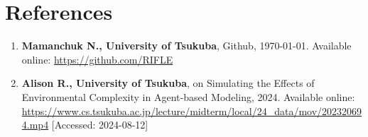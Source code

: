 \documentclass[12pt,a4paper]{article}
\begin{document}


\section*{References}
\begin{enumerate}
    \item \textbf{Mamanchuk N., University of Tsukuba}, Github, \today. Available online: \url{https://github.com/RIFLE}
    \item \textbf{Alison R., University of Tsukuba}, on Simulating the Effects of Environmental Complexity in Agent-based Modeling, 2024. Available online: \url{https://www.cs.tsukuba.ac.jp/lecture/midterm/local/24_data/mov/202320694.mp4} [Accessed: 2024-08-12]
\end{enumerate}

\newpage
\end{document}
